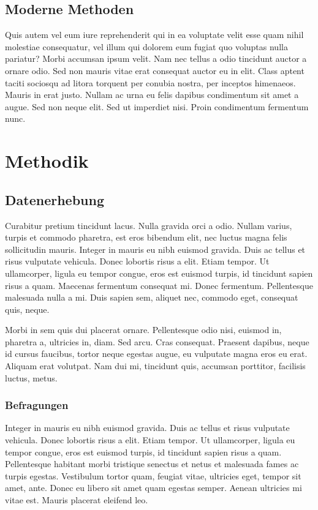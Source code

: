 \documentclass[twocolumn]{article}
\begin{document}
\subsection{Moderne Methoden}
Quis autem vel eum iure reprehenderit qui in ea voluptate velit esse quam nihil molestiae consequatur, vel illum qui dolorem eum fugiat quo voluptas nulla pariatur? Morbi accumsan ipsum velit. Nam nec tellus a odio tincidunt auctor a ornare odio. Sed non mauris vitae erat consequat auctor eu in elit. Class aptent taciti sociosqu ad litora torquent per conubia nostra, per inceptos himenaeos. Mauris in erat justo. Nullam ac urna eu felis dapibus condimentum sit amet a augue. Sed non neque elit. Sed ut imperdiet nisi. Proin condimentum fermentum nunc.


\section{Methodik}
\subsection{Datenerhebung}
Curabitur pretium tincidunt lacus. Nulla gravida orci a odio. Nullam varius, turpis et commodo pharetra, est eros bibendum elit, nec luctus magna felis sollicitudin mauris. Integer in mauris eu nibh euismod gravida. Duis ac tellus et risus vulputate vehicula. Donec lobortis risus a elit. Etiam tempor. Ut ullamcorper, ligula eu tempor congue, eros est euismod turpis, id tincidunt sapien risus a quam. Maecenas fermentum consequat mi. Donec fermentum. Pellentesque malesuada nulla a mi. Duis sapien sem, aliquet nec, commodo eget, consequat quis, neque.

Morbi in sem quis dui placerat ornare. Pellentesque odio nisi, euismod in, pharetra a, ultricies in, diam. Sed arcu. Cras consequat. Praesent dapibus, neque id cursus faucibus, tortor neque egestas augue, eu vulputate magna eros eu erat. Aliquam erat volutpat. Nam dui mi, tincidunt quis, accumsan porttitor, facilisis luctus, metus.

\subsubsection{Befragungen}
Integer in mauris eu nibh euismod gravida. Duis ac tellus et risus vulputate vehicula. Donec lobortis risus a elit. Etiam tempor. Ut ullamcorper, ligula eu tempor congue, eros est euismod turpis, id tincidunt sapien risus a quam. Pellentesque habitant morbi tristique senectus et netus et malesuada fames ac turpis egestas. Vestibulum tortor quam, feugiat vitae, ultricies eget, tempor sit amet, ante. Donec eu libero sit amet quam egestas semper. Aenean ultricies mi vitae est. Mauris placerat eleifend leo.
\end{document}
